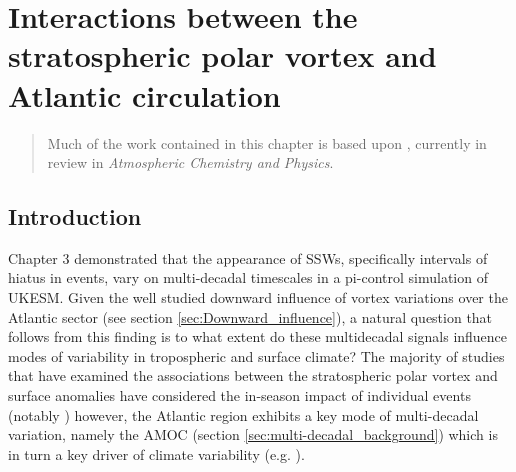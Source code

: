 \chapter{Interactions between the stratospheric polar vortex and Atlantic circulation} 
\begin{quotation}
  Much of the work contained in this chapter is based upon \cite{dimdore-milesInteractions2021},
  currently in review in \emph{Atmospheric Chemistry and Physics}.
\end{quotation}

\label{cha:surface}

\section{Introduction}
Chapter 3 demonstrated that the appearance of SSWs, specifically intervals of hiatus in events, vary on multi-decadal timescales in a pi-control simulation of UKESM. Given the well studied downward influence of vortex variations over the Atlantic sector (see section \ref{sec:Downward_influence}), a natural question that follows from this finding is to what extent do these multidecadal signals influence modes of variability in tropospheric and surface climate? The majority of studies that have examined the associations between the stratospheric polar vortex and surface anomalies have considered the in-season impact of individual events (notably \cite{baldwinStratospheric2001a}) however, the Atlantic region exhibits a key mode of multi-decadal variation, namely the AMOC (section \ref{sec:multi-decadal_background}) which is in turn a key driver of climate variability (e.g. \cite{frankignoulInfluence2013b}). 

